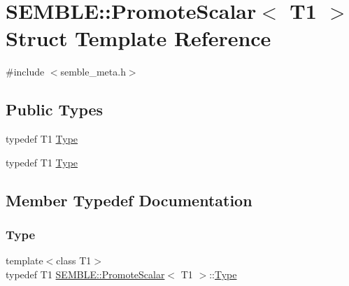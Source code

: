 \hypertarget{structSEMBLE_1_1PromoteScalar}{}\section{S\+E\+M\+B\+LE\+:\+:Promote\+Scalar$<$ T1 $>$ Struct Template Reference}
\label{structSEMBLE_1_1PromoteScalar}


{\ttfamily \#include $<$semble\+\_\+meta.\+h$>$}

\subsection*{Public Types}
\begin{DoxyCompactItemize}
\item 
typedef T1 \mbox{\hyperlink{structSEMBLE_1_1PromoteScalar_a3d460c95c065a6844726ec8397ba3c23}{Type}}
\item 
typedef T1 \mbox{\hyperlink{structSEMBLE_1_1PromoteScalar_a3d460c95c065a6844726ec8397ba3c23}{Type}}
\end{DoxyCompactItemize}


\subsection{Member Typedef Documentation}
\mbox{\label{structSEMBLE_1_1PromoteScalar_a3d460c95c065a6844726ec8397ba3c23}} 
\subsubsection{\texorpdfstring{Type}{Type}\hspace{0.1cm}{\footnotesize\ttfamily [1/2]}}
{\footnotesize\ttfamily template$<$class T1$>$ \\
typedef T1 \mbox{\hyperlink{structSEMBLE_1_1PromoteScalar}{S\+E\+M\+B\+L\+E\+::\+Promote\+Scalar}}$<$ T1 $>$\+::\mbox{\hyperlink{structSEMBLE_1_1PromoteScalar_a3d460c95c065a6844726ec8397ba3c23}{Type}}}

\mbox{\label{structSEMBLE_1_1PromoteScalar_a3d460c95c065a6844726ec8397ba3c23}} 

